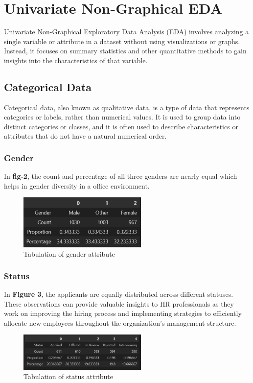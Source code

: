\documentclass[lettersize,journal]{IEEEtran}
\begin{document}
\section{Univariate Non-Graphical EDA}
Univariate Non-Graphical Exploratory Data Analysis (EDA) involves analyzing a single variable or attribute in a dataset without using visualizations or graphs. Instead, it focuses on summary statistics and other quantitative methods to gain insights into the characteristics of that variable.
\subsection{Categorical Data}
Categorical data, also known as qualitative data, is a type of data that represents categories or labels, rather than numerical values. It is used to group data into distinct categories or classes, and it is often used to describe characteristics or attributes that do not have a natural numerical order.


\subsubsection{Gender}
In \textbf{fig-2}, the count and percentage of all three genders are nearly equal which helps in gender diversity in a office environment.


\begin{figure}[h]
\centering
\includegraphics[width=2.5in]{Screenshot 2023-09-08 151203.png}
\caption{Tabulation of gender attribute}
\label{fig_2}
\end{figure}

\subsubsection{Status}
In \textbf{Figure 3}, the applicants are equally distributed across different statuses. These observations can provide valuable insights to HR professionals as they work on improving the hiring process and implementing strategies to efficiently allocate new employees throughout the organization's management structure.

\begin{figure}[h]
\centering
\includegraphics[width=2.5in]{Screenshot 2023-09-08 152511.png}
\caption{Tabulation of status attribute}
\label{fig_3}
\end{figure}
\end{document}
